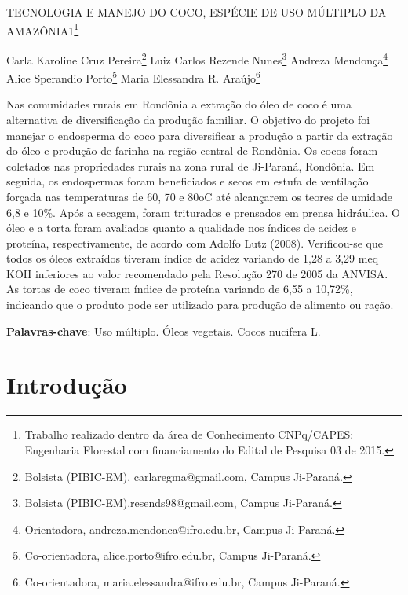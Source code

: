 \documentclass[article,12pt,onesidea,4paper,english,brazil]{abntex2}
\begin{document}
	
	
	\frenchspacing 
	
	\begin{center}
		\LARGE TECNOLOGIA E MANEJO DO COCO, ESPÉCIE DE USO MÚLTIPLO DA AMAZÔNIA1\footnote{Trabalho realizado dentro da área de Conhecimento CNPq/CAPES: Engenharia Florestal com financiamento do Edital de Pesquisa 03 de 2015.}
		
		\normalsize
	Carla Karoline Cruz Pereira\footnote{Bolsista (PIBIC-EM), carlaregma@gmail.com, Campus Ji-Paraná.} 
		Luiz Carlos Rezende Nunes\footnote{Bolsista (PIBIC-EM),resends98@gmail.com, Campus Ji-Paraná.} 
		Andreza Mendonça\footnote{Orientadora, andreza.mendonca@ifro.edu.br, Campus Ji-Paraná.} \\
		Alice Sperandio Porto\footnote{Co-orientadora, alice.porto@ifro.edu.br, Campus Ji-Paraná.}
	Maria Elessandra R. Araújo\footnote{Co-orientadora, maria.elessandra@ifro.edu.br, Campus Ji-Paraná.} 
	\end{center}
	
	\begin{resumoumacoluna}
	Nas comunidades rurais em Rondônia a extração do óleo de coco é uma alternativa de diversificação da produção familiar. O objetivo do projeto foi manejar o endosperma do coco para diversificar a produção a partir da extração do óleo e produção de farinha na região central de Rondônia. Os cocos foram coletados nas propriedades rurais na zona rural de Ji-Paraná, Rondônia. Em seguida, os endospermas foram beneficiados e secos em estufa de ventilação forçada nas temperaturas de 60, 70 e 80oC até alcançarem os teores de umidade 6,8 e 10\%. Após a secagem, foram triturados e prensados em prensa hidráulica. O óleo e a torta foram avaliados quanto a qualidade nos índices de acidez e proteína, respectivamente, de acordo com Adolfo Lutz (2008). Verificou-se que todos os óleos extraídos tiveram índice de acidez variando de 1,28 a 3,29 meq KOH inferiores ao valor recomendado pela Resolução 270 de 2005 da ANVISA. As tortas de coco tiveram índice de proteína variando de 6,55 a 10,72\%, indicando que o produto pode ser utilizado para produção de alimento ou ração.
		\vspace{\onelineskip}
		
		\noindent
		\textbf{Palavras-chave}: Uso múltiplo. Óleos vegetais. Cocos nucifera L.
	\end{resumoumacoluna}
	
	\section*{Introdução}
	
\end{document}
